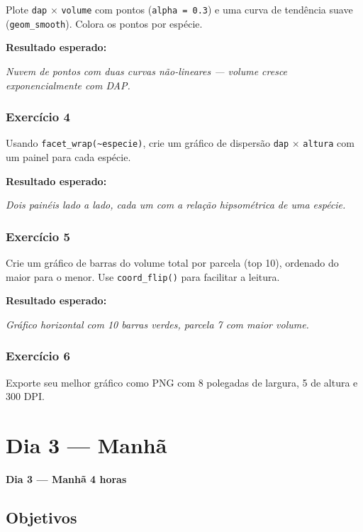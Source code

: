 \documentclass[
  letterpaper,
]{scrbook}
\begin{document}
Plote \texttt{dap} × \texttt{volume} com pontos (\texttt{alpha\ =\ 0.3})
e uma curva de tendência suave (\texttt{geom\_smooth}). Colora os pontos
por espécie.

\textbf{Resultado esperado:}

\emph{Nuvem de pontos com duas curvas não-lineares --- volume cresce
exponencialmente com DAP.}

\subsection{Exercício 4}\label{exercuxedcio-4-6}

Usando \texttt{facet\_wrap(\textasciitilde{}especie)}, crie um gráfico
de dispersão \texttt{dap} × \texttt{altura} com um painel para cada
espécie.

\textbf{Resultado esperado:}

\emph{Dois painéis lado a lado, cada um com a relação hipsométrica de
uma espécie.}

\subsection{Exercício 5}\label{exercuxedcio-5-3}

Crie um gráfico de barras do volume total por parcela (top 10), ordenado
do maior para o menor. Use \texttt{coord\_flip()} para facilitar a
leitura.

\textbf{Resultado esperado:}

\emph{Gráfico horizontal com 10 barras verdes, parcela 7 com maior
volume.}

\subsection{Exercício 6}\label{exercuxedcio-6-1}

Exporte seu melhor gráfico como PNG com 8 polegadas de largura, 5 de
altura e 300 DPI.

\chapter{Dia 3 --- Manhã}\label{dia-3-manhuxe3}

\textbf{Dia 3 --- Manhã \textbar{} 4 horas}

\section*{Objetivos}\label{objetivos-4}
\end{document}
